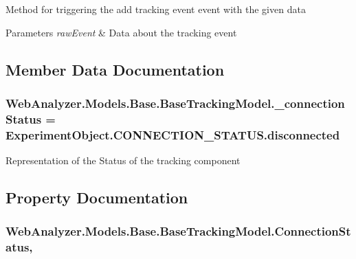 Method for triggering the add tracking event event with the given data 


\begin{DoxyParams}{Parameters}
{\em raw\+Event} & Data about the tracking event\\
\hline
\end{DoxyParams}


\subsection{Member Data Documentation}
\hypertarget{class_web_analyzer_1_1_models_1_1_base_1_1_base_tracking_model_aecba61dd2b171d2f6dcf3abc40229d39}{}
\subsubsection[{\+\_\+connection\+Status}]{ Web\+Analyzer.\+Models.\+Base.\+Base\+Tracking\+Model.\+\_\+connection\+Status = Experiment\+Object.\+C\+O\+N\+N\+E\+C\+T\+I\+O\+N\+\_\+\+S\+T\+A\+T\+U\+S.\+disconnected\hspace{0.3cm}{\ttfamily [protected]}}\label{class_web_analyzer_1_1_models_1_1_base_1_1_base_tracking_model_aecba61dd2b171d2f6dcf3abc40229d39}


Representation of the Status of the tracking component 



\subsection{Property Documentation}
\hypertarget{class_web_analyzer_1_1_models_1_1_base_1_1_base_tracking_model_aea243d67939ea7e2e62adbdecc525026}{}
\subsubsection[{Connection\+Status}]{ Web\+Analyzer.\+Models.\+Base.\+Base\+Tracking\+Model.\+Connection\+Status\hspace{0.3cm}{\ttfamily [get]}, {\ttfamily [set]}}\label{class_web_analyzer_1_1_models_1_1_base_1_1_base_tracking_model_aea243d67939ea7e2e62adbdecc525026}


